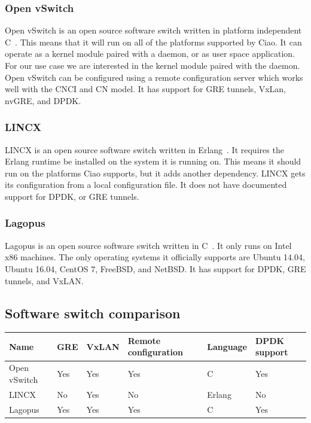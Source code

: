 \documentclass[10pt,letterpaper,onecolumn,draftclsnofoot]{IEEEtran}
\begin{document}
\subsubsection{Open vSwitch}
Open vSwitch is an open source software switch written in platform independent C~\cite{ovs-readme}.
This means that it will run on all of the platforms supported by Ciao.
It can operate as a kernel module paired with a daemon, or as user space application.
For our use case we are interested in the kernel module paired with the daemon.
Open vSwitch can be configured using a remote configuration server which works well with the CNCI and CN model.
It has support for GRE tunnels, VxLan, nvGRE, and DPDK.

\subsubsection{LINCX}
LINCX is an open source software switch written in Erlang~\cite{lincx}.
It requires the Erlang runtime be installed on the system it is running on.
This means it should run on the platforms Ciao supports, but it adds another dependency.
LINCX gets its configuration from a local configuration file.
It does not have documented support for DPDK, or GRE tunnels.

\subsubsection{Lagopus}
Lagopus is an open source software switch written in C~\cite{lagopus}.
It only runs on Intel x86 machines.
The only operating systems it officially supports are Ubuntu 14.04, Ubuntu 16.04, CentOS 7, FreeBSD, and NetBSD.
It has support for DPDK, GRE tunnels, and VxLAN.


\subsection{Software switch comparison}

\begin{center}
	\begin{tabular}{| l | l | l | l | l | l |}
		\hline
		Name & GRE & VxLAN & Remote configuration & Language & DPDK support  \\ \hline
		Open vSwitch & Yes & Yes & Yes & C & Yes \\ \hline
		LINCX & No & Yes & No & Erlang & No \\ \hline
		Lagopus & Yes & Yes & Yes & C & Yes \\ \hline
	\end{tabular}
\end{center}
\end{document}
